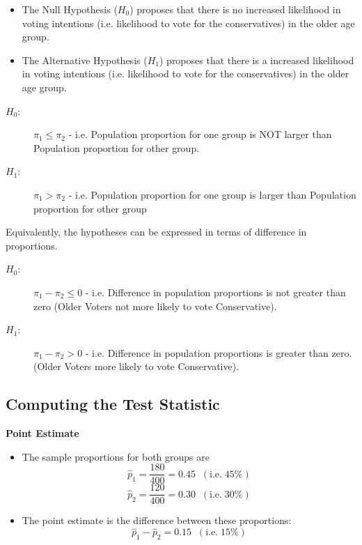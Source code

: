 \documentclass[a4paper,12pt]{article}
\begin{document}
\begin{itemize}
    \item The Null Hypothesis ($H_0$) proposes that there is no increased likelihood in voting intentions (i.e. likelihood to vote for the conservatives) in the older age group.
    \item The Alternative Hypothesis ($H_1$) proposes that there is a increased likelihood in voting intentions (i.e. likelihood to vote for the conservatives) in the older age group.
\end{itemize}
\begin{description}
\item[$H_0$:] $\pi_1 \leq \pi_2$  - i.e. Population proportion for one group is NOT larger than Population proportion for other group.
\item[$H_1$:] $\pi_1 > \pi_2$ - i.e. Population proportion for one group is  larger than Population proportion for other group
\end{description}

\noindent Equivalently, the hypotheses can be expressed in terms of difference in proportions.
\begin{description}
\item[$H_0$:] $\pi_1 - \pi_2 \leq 0$ - i.e. Difference in population proportions is not greater than zero (Older Voters not more likely to vote Conservative).
\item[$H_1$:] $\pi_1 - \pi_2 > 0$ - i.e. Difference in population proportions is greater than zero. (Older Voters more likely to vote Conservative).
\end{description}
\newpage
\subsection*{Computing the Test Statistic}
\noindent \textbf{Point Estimate}

\begin{itemize}
    \item The sample proportions for both groups are
    \[ \hat{p}_1 = \frac{180}{400} = 0.45 \;\;(\mbox{i.e.}\; 45\%) \] 
    \[ \hat{p}_2 = \frac{120}{400} = 0.30 \;\;(\mbox{i.e.}\; 30\%) \]  
    \item The point estimate is the difference between these proportions:
    \[ \hat{p}_1  - \hat{p}_2  = 0.15 \;\;(\mbox{i.e.}\; 15\%) \]
\end{itemize}
\end{document}
